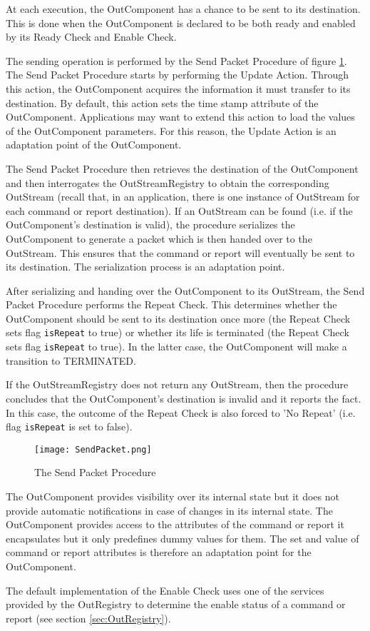 At each execution, the OutComponent has a chance to be sent to its destination. This is done when the OutComponent is declared to be both ready and enabled by its Ready Check and Enable Check. 

The sending operation is performed by the Send Packet Procedure of figure \ref{fig:SendPacket}. The Send Packet Procedure starts by performing the Update Action. Through this action, the OutComponent acquires the information it must transfer to its destination. By default, this action sets the time stamp attribute of the OutComponent. Applications may want to extend this action to load the values of the OutComponent parameters. For this reason, the Update Action is an adaptation point of the OutComponent.

The Send Packet Procedure then retrieves the destination of the OutComponent and then interrogates the OutStreamRegistry to obtain the corresponding OutStream (recall that, in an application, there is one instance of OutStream for each command or report destination). If an OutStream can be found (i.e. if the OutComponent's destination is valid), the procedure serializes the OutComponent to generate a packet which is then handed over to the OutStream. This ensures that the command or report will eventually be sent to its destination. The serialization process is an adaptation point. 

After serializing and handing over the OutComponent to its OutStream, the Send Packet Procedure performs the Repeat Check. This determines whether the OutComponent should be sent to its destination once more (the Repeat Check sets flag \texttt{isRepeat} to true) or whether its life is terminated (the Repeat Check sets flag \texttt{isRepeat} to true). In the latter case, the OutComponent will make a transition to TERMINATED.

If the OutStreamRegistry does not return any OutStream, then the procedure concludes that the OutComponent's destination is invalid and it reports the fact. In this case, the outcome of the Repeat Check is also forced to 'No Repeat' (i.e. flag \texttt{isRepeat} is set to false). 

\begin{figure}[h]
 \centering
 \texttt{[image: SendPacket.png]}
 \caption{The Send Packet Procedure}
 \label{fig:SendPacket}
\end{figure}

The OutComponent provides visibility over its internal state but it does not provide automatic notifications in case of changes in its internal state. The OutComponent provides access to the attributes of the command or report it encapsulates but it only predefines dummy values for them. The set and value of command or report attributes is therefore an adaptation point for the OutComponent. 

The default implementation of the Enable Check uses one of the services provided by the OutRegistry to determine the enable status of a command or report (see section \ref{sec:OutRegistry}).
